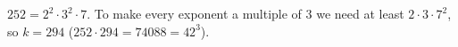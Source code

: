 $252=2^2\cdot3^2\cdot7$. To make every exponent a multiple of $3$ we need at least $2\cdot3\cdot7^2$, so $k=\boxed{294}$ ($252\cdot294=74088=42^3$).
